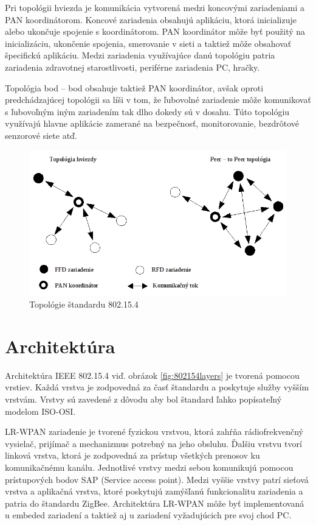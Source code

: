 \documentclass[11pt,twoside,a4paper]{book}
\begin{document}
Pri topológii hviezda je komunikácia vytvorená medzi koncovými zariadeniami a PAN koordinátorom. Koncové zariadenia obsahujú aplikáciu, ktorá inicializuje alebo ukončuje spojenie s koordinátorom. PAN koordinátor môže byť použitý na inicializáciu, ukončenie spojenia, smerovanie v sieti a taktiež môže obsahovať špecifickú aplikáciu. Medzi zariadenia využívajúce danú topológiu patria zariadenia zdravotnej starostlivosti, periférne zariadenia PC, hračky.

Topológia bod – bod obsahuje taktiež PAN koordinátor, avšak oproti predchádzajúcej topológii sa líši v tom, že ľubovolné zariadenie môže komunikovať s ľubovoľným iným zariadením tak dlho dokedy sú v dosahu. Túto topológiu využívajú hlavne aplikácie zamerané na bezpečnosť, monitorovanie, bezdrôtové senzorové siete atď.

\begin{figure}[h]
 \centering
 \includegraphics[width=12cm]{./figures/topologies802154.png}
 \caption{Topológie štandardu 802.15.4}
 \label{fig:80215topologies}
\end{figure}


\section{Architektúra}
Architektúra IEEE 802.15.4 viď. obrázok \ref{fig:802154layers} je tvorená pomocou vrstiev. Každá vrstva je zodpovedná za časť štandardu a poskytuje služby vyšším vrstvám. Vrstvy sú zavedené z dôvodu aby bol štandard ľahko popísateľný modelom ISO-OSI. 

LR-WPAN zariadenie je tvorené fyzickou vrstvou, ktorá zahŕňa rádiofrekvenčný vysielač, prijímač a mechanizmus potrebný na jeho obsluhu. Ďalšiu vrstvu tvorí linková vrstva, ktorá je zodpovedná za prístup všetkých prenosov ku komunikačnému kanálu. Jednotlivé vrstvy medzi sebou komunikujú pomocou prístupových bodov SAP (Service access point). Medzi vyššie vrstvy patrí sieťová vrstva a aplikačná vrstva, ktoré poskytujú zamýšľanú funkcionalitu zariadenia a patria do štandardu ZigBee. Architektúra LR-WPAN môže byť implementovaná u embeded zariadení a taktiež aj u zariadení vyžadujúcich pre svoj chod PC.
\end{document}
